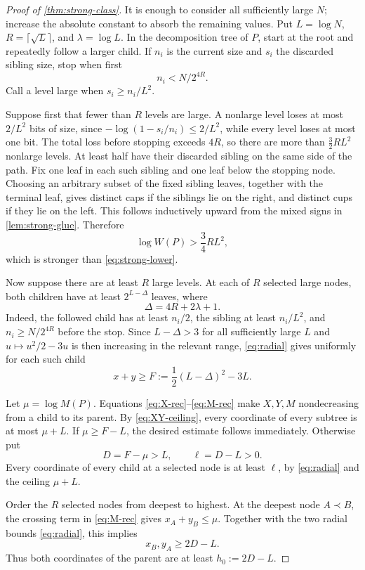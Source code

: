\documentclass[11pt]{article}
\theoremstyle{remark}
\begin{document}
\begin{proof}[Proof of \cref{thm:strong-class}]
It is enough to consider all sufficiently large $N$; increase the absolute
constant to absorb the remaining values.  Put $L=\log N$,
$R=\lceil\sqrt L\rceil$, and $\lambda=\log L$.  In the decomposition tree
of $P$, start at the root and repeatedly follow a larger child.  If $n_i$
is the current size and $s_i$ the discarded sibling size, stop when first
\[
 n_i<N/2^{4R}.
\]
Call a level large when $s_i\ge n_i/L^2$.

Suppose first that fewer than $R$ levels are large.  A nonlarge level loses
at most $2/L^2$ bits of size, since
$-\log(1-s_i/n_i)\le2/L^2$, while every level loses at most one bit.
The total loss before stopping exceeds $4R$, so there are more than
$\frac32RL^2$ nonlarge levels.  At least half have their discarded sibling
on the same side of the path.  Fix one leaf in each such sibling and one
leaf below the stopping node.  Choosing an arbitrary subset of the fixed
sibling leaves, together with the terminal leaf, gives distinct caps if
the siblings lie on the right, and distinct cups if they lie on the left.
This follows inductively upward from the mixed signs in
\cref{lem:strong-glue}.  Therefore
\[
 \log W(P)>\frac34RL^2,
\]
which is stronger than \eqref{eq:strong-lower}.

Now suppose there are at least $R$ large levels.  At each of $R$ selected
large nodes, both children have at least $2^{L-\Delta}$ leaves, where
\[
 \Delta=4R+2\lambda+1.
\]
Indeed, the followed child has at least $n_i/2$, the sibling at least
$n_i/L^2$, and $n_i\ge N/2^{4R}$ before the stop.  Since
$L-\Delta>3$ for all sufficiently large $L$ and
$u\mapsto u^2/2-3u$ is then increasing in the relevant range,
\eqref{eq:radial} gives uniformly for each such child
\[
 x+y\ge F:=\frac12(L-\Delta)^2-3L.
\]

Let $\mu=\log M(P)$.  Equations \eqref{eq:X-rec}--\eqref{eq:M-rec} make
$X,Y,M$ nondecreasing from a child to its parent.  By
\eqref{eq:XY-ceiling}, every coordinate of every subtree is at most
$\mu+L$.  If $\mu\ge F-L$, the desired estimate follows immediately.
Otherwise put
\[
 D=F-\mu>L,\qquad \ell=D-L>0.
\]
Every coordinate of every child at a selected node is at least $\ell$, by
\eqref{eq:radial} and the ceiling $\mu+L$.

Order the $R$ selected nodes from deepest to highest.  At the deepest node
$A\prec B$, the crossing term in \eqref{eq:M-rec} gives
$x_A+y_B\le\mu$.  Together with the two radial bounds
\eqref{eq:radial}, this implies
\[
 x_B,y_A\ge2D-L.
\]
Thus both coordinates of the parent are at least $h_0:=2D-L$.


\end{proof}
\end{document}
